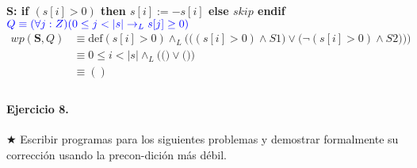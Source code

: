 \documentclass{article}
\begin{document}
\begin{enumerate}[label=\alph*)]
   		\textbf{S: if $(s[i]>0)$ then $s[i]:= -s[i] $ else $skip$ endif}\\
   		\hspace*{24mm}$\color{blue}Q \equiv (\forall j :Z)(0 \leq j < |s| 
   			\rightarrow_L s[j] \geq 0)$\\
   		\begin{align*}
   			wp(\textbf{S},Q)&\equiv \textrm{def}(s[i]>0)\wedge_L 
   				\Bigg(\Big((s[i]>0)\wedge S1\Big) \vee\Big(\neg (s[i]>0)\wedge S2)\Big)\Bigg)\\
   							&\equiv 0\leq i<|s|\wedge_L\Bigg(\Big(\Big) \vee \Big(\Big)\Bigg)\\
   							&\equiv () \\
   		\end{align*}	
\end{enumerate}
                                                          
\paragraph{Ejercicio 8.} $\bigstar$ Escribir programas para los siguientes problemas y demostrar 
formalmente su corrección usando la precon-dición más débil.
\end{document}
